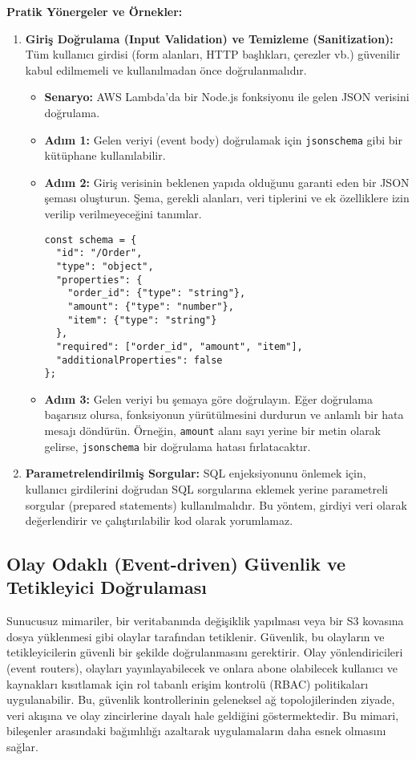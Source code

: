 \textbf{Pratik Yönergeler ve Örnekler:}
\begin{enumerate}
    \item \textbf{Giriş Doğrulama (Input Validation) ve Temizleme (Sanitization):} Tüm kullanıcı girdisi (form alanları, HTTP başlıkları, çerezler vb.) güvenilir kabul edilmemeli ve kullanılmadan önce doğrulanmalıdır.
    \begin{itemize}
        \item \textbf{Senaryo:} AWS Lambda'da bir Node.js fonksiyonu ile gelen JSON verisini doğrulama.
        \item \textbf{Adım 1:} Gelen veriyi (event body) doğrulamak için \texttt{jsonschema} gibi bir kütüphane kullanılabilir.
        \item \textbf{Adım 2:} Giriş verisinin beklenen yapıda olduğunu garanti eden bir JSON şeması oluşturun. Şema, gerekli alanları, veri tiplerini ve ek özelliklere izin verilip verilmeyeceğini tanımlar.
\begin{verbatim}
const schema = {
  "id": "/Order",
  "type": "object",
  "properties": {
    "order_id": {"type": "string"},
    "amount": {"type": "number"},
    "item": {"type": "string"}
  },
  "required": ["order_id", "amount", "item"],
  "additionalProperties": false
};
\end{verbatim}
        \item \textbf{Adım 3:} Gelen veriyi bu şemaya göre doğrulayın. Eğer doğrulama başarısız olursa, fonksiyonun yürütülmesini durdurun ve anlamlı bir hata mesajı döndürün. Örneğin, \texttt{amount} alanı sayı yerine bir metin olarak gelirse, \texttt{jsonschema} bir doğrulama hatası fırlatacaktır.
    \end{itemize}
    \item \textbf{Parametrelendirilmiş Sorgular:} SQL enjeksiyonunu önlemek için, kullanıcı girdilerini doğrudan SQL sorgularına eklemek yerine parametreli sorgular (prepared statements) kullanılmalıdır. Bu yöntem, girdiyi veri olarak değerlendirir ve çalıştırılabilir kod olarak yorumlamaz.
\end{enumerate}

\subsection{Olay Odaklı (Event-driven) Güvenlik ve Tetikleyici Doğrulaması}
Sunucusuz mimariler, bir veritabanında değişiklik yapılması veya bir S3 kovasına dosya yüklenmesi gibi olaylar tarafından tetiklenir. Güvenlik, bu olayların ve tetikleyicilerin güvenli bir şekilde doğrulanmasını gerektirir. Olay yönlendiricileri (event routers), olayları yayınlayabilecek ve onlara abone olabilecek kullanıcı ve kaynakları kısıtlamak için rol tabanlı erişim kontrolü (RBAC) politikaları uygulanabilir. Bu, güvenlik kontrollerinin geleneksel ağ topolojilerinden ziyade, veri akışına ve olay zincirlerine dayalı hale geldiğini göstermektedir. Bu mimari, bileşenler arasındaki bağımlılığı azaltarak uygulamaların daha esnek olmasını sağlar.

